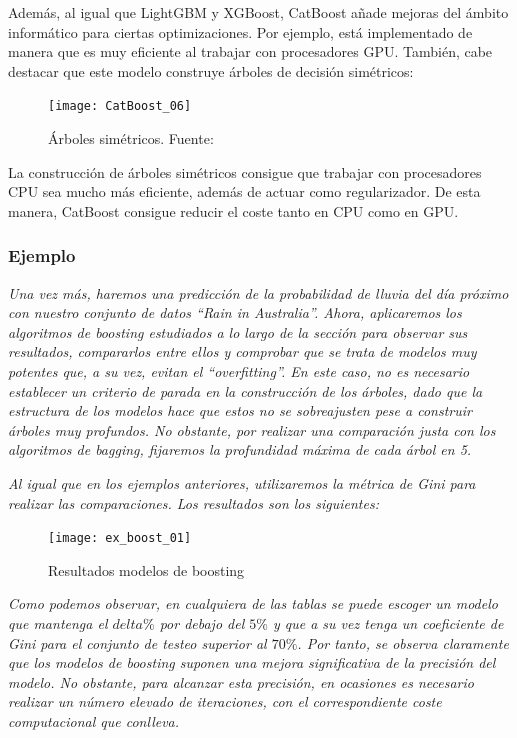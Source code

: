 \documentclass[12pt,twoside]{article}
\begin{document}
Además, al igual que LightGBM y XGBoost, CatBoost añade mejoras del ámbito informático para ciertas optimizaciones. Por ejemplo, está implementado de manera que es muy eficiente al trabajar con procesadores GPU. También, cabe destacar que este modelo construye árboles de decisión simétricos:
\begin{figure}[h]
\centering
\texttt{[image: CatBoost\_06]}
\caption{Árboles simétricos. Fuente: \cite{SE01}}
\end{figure}

La construcción de árboles simétricos consigue que trabajar con procesadores CPU sea mucho más eficiente, además de actuar como regularizador. De esta manera, CatBoost consigue reducir el coste tanto en CPU como en GPU.




\subsubsection{Ejemplo} \label{ex:Boost}

\emph{Una vez más, haremos una predicción de la probabilidad de lluvia del día próximo con nuestro conjunto de datos ``Rain in Australia''. Ahora, aplicaremos los algoritmos de boosting estudiados a lo largo de la sección para observar sus resultados, compararlos entre ellos y comprobar que se trata de modelos muy potentes que, a su vez, evitan el ``overfitting''. En este caso, no es necesario establecer un criterio de parada en la construcción de los árboles, dado que la estructura de los modelos hace que estos no se sobreajusten pese a construir árboles muy profundos. No obstante, por realizar una comparación justa con los algoritmos de bagging, fijaremos la profundidad máxima de cada árbol en 5.}

\emph{Al igual que en los ejemplos anteriores, utilizaremos la métrica de Gini para realizar las comparaciones. Los resultados son los siguientes:}

\begin{figure}[h]
\centering
\texttt{[image: ex\_boost\_01]}
\caption{Resultados modelos de boosting}
\end{figure}

\emph{Como podemos observar, en cualquiera de las tablas se puede escoger un modelo que mantenga el $delta\%$ por debajo del $5\%$ y que a su vez tenga un coeficiente de Gini para el conjunto de testeo superior al $70\%$. Por tanto, se observa claramente que los modelos de boosting suponen una mejora significativa de la precisión del modelo. No obstante, para alcanzar esta precisión, en ocasiones es necesario realizar un número elevado de iteraciones, con el correspondiente coste computacional que conlleva.}
\end{document}
